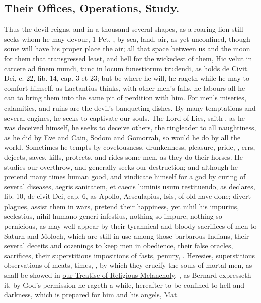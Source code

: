 {{\subsection{Their Offices, Operations, Study.}
Thus the devil reigns, and in a thousand several shapes, as a roaring lion still seeks whom he may
devour, 1 Pet. , by sea, land, air, as yet unconfined, though 
some will have his proper place the air; all that space between us and
the moon for them that transgressed least, and hell for the wickedest
of them, Hic velut in carcere ad finem mundi, tunc in locum funestiorum
trudendi, as \Austin{} holds de Civit. Dei, c. 22, lib. 14, cap. 3 et 23;
but be where he will, he rageth while he may to comfort himself, as
 Lactantius thinks, with other men's falls, he labours all he can
to bring them into the same pit of perdition with him. For men's
miseries, calamities, and ruins are the devil's banqueting dishes. By
many temptations and several engines, he seeks to captivate our souls.
The Lord of Lies, saith \Austin{}, as he was deceived himself, he
seeks to deceive others, the ringleader to all naughtiness, as he did
by Eve and Cain, Sodom and Gomorrah, so would he do by all the world.
Sometimes he tempts by covetousness, drunkenness, pleasure, pride, \etc{},
errs, dejects, saves, kills, protects, and rides some men, as they do
their horses. He studies our overthrow, and generally seeks our
destruction; and although he pretend many times human good, and
vindicate himself for a god by curing of several diseases, aegris
sanitatem, et caecis luminis usum restituendo, as \Austin{} declares, lib.
10, de civit Dei, cap. 6, as Apollo, Aesculapius, Isis, of old have
done; divert plagues, assist them in wars, pretend their happiness, yet
nihil his impurius, scelestius, nihil humano generi infestius, nothing
so impure, nothing so pernicious, as may well appear by their
tyrannical and bloody sacrifices of men to Saturn and Moloch, which are
still in use among those barbarous Indians, their several deceits and
cozenings to keep men in obedience, their false oracles, sacrifices,
their superstitious impositions of fasts, penury, \etc{}. Heresies,
superstitious observations of meats, times, \etc{}, by which they 
crucify the souls of mortal men, as shall be showed in \hyperref[ch:religious-melancholy]{our Treatise of
Religious Melancholy}. , as Bernard expresseth it, by God's permission he rageth a while, hereafter
to be confined to hell and darkness, which is prepared for him and his
angels, Mat. 

}}

